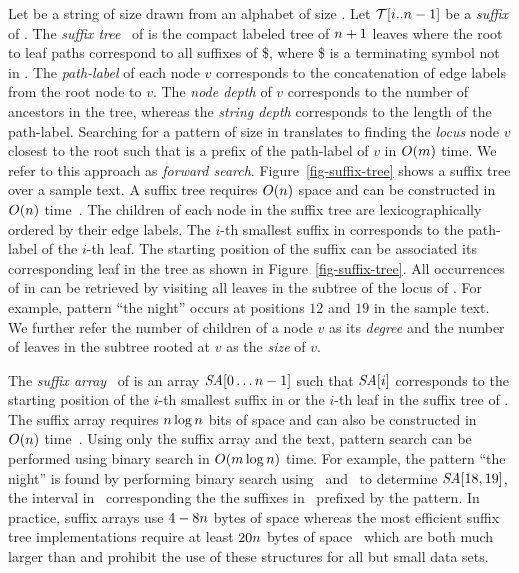 Let {\col} be a string of size {\collen} drawn from an alphabet {\alphabet} of
size {\alphabetsize}. Let {$\mathcal{T}[i..n-1]$} be a {\it suffix} of {\col}.
The {\it suffix tree}~\cite{w-swat73} of {\col} is the compact labeled
tree of $n+1$ leaves where the root to leaf paths correspond to all suffixes of {\col\$},
where \$ is a terminating symbol not in {\alphabet}. The {\it path-label}
of each node $v$ corresponds to the concatenation of edge labels from the
root node to $v$. The {\it node depth} of $v$ corresponds to the number
of ancestors in the tree, whereas the {\it string depth} corresponds to the
length of the path-label. Searching for a pattern {\pattern} of 
size {\plen} in {\col} translates to finding the {\it locus} node $v$ closest to
the root such that {\pattern} is a prefix of the path-label of $v$ in $O(m)$ time.
We refer to this approach as {\it forward search}.
Figure~\ref{fig-suffix-tree} shows a suffix tree over a sample text. 
A suffix tree requires $O(n)$ space 
and can be constructed in $O(n)$ time~\cite{u-algo95}. The children
of each node in the suffix tree are lexicographically ordered by their edge labels.
The $i$-th smallest suffix in {\col} corresponds to the path-label of the $i$-th 
leaf. The starting position of the suffix can be associated its corresponding
leaf in the tree as shown in Figure~\ref{fig-suffix-tree}. All 
occurrences of {\pattern} in {\col} can be retrieved by visiting all leaves
in the subtree of the locus of {\pattern}. For example, pattern ``the night'' occurs
at positions $12$ and $19$ in the sample text. We further refer the number of children
of a node $v$ as its {\it degree} and the number of leaves in the subtree rooted at $v$
as the {\it size} of $v$.

The {\it suffix array}~\cite{mm-jcomp93} of {\col} is an array $\mbox{\emph{SA}}[0\ldots n-1]$ such
that $\mbox{\emph{SA}}[i]$ corresponds to the starting position of the $i$-th smallest suffix
in {\col} or the $i$-th leaf in the suffix tree of {\col}. The suffix array requires
$n \log n$ bits of space and can also be constructed in $O(n)$ time~\cite{ksb-jacm06}.
Using only the suffix array and the text, pattern search can be performed using binary search
in $O(m \log n)$ time. For example, the pattern ``the night'' is found by performing
binary search using \SA\ and \col\ to determine $\mbox{\emph{SA}}[18,19]$, the interval in 
\SA\ corresponding the the suffixes in \col\ prefixed by the pattern.
In practice, suffix arrays use $4-8n$ bytes of space whereas the most efficient
suffix tree implementations require at least $20n$ bytes of space~\cite{k-spe99} which
are both much larger than {\col} and prohibit the use of these structures for all but
small data sets.

